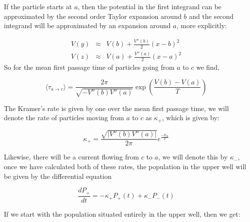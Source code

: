 If the particle starts at $a$, then the potential in the first integrand can be approximated by the second order Taylor expansion around $b$ and the second integrand will be approximated by an expansion around $a$, more explicitly:

\begin{eqnarray}
V(y) &\approx& V(b) + \frac{V''(b)}{2}(x - b)^2 \\
V(z) &\approx& V(a) + \frac{V''(a)}{2}(x - a)^2 
\end{eqnarray}
So for the mean first passage time of particles going from $a$ to $c$ we find,

\begin{equation}
\langle \tau_{a \to c} \rangle = \frac{2 \pi}{\sqrt{-V''(b) V''(a)}} \exp{\left (\frac{V(b) - V(a)}{T} \right)}  \label{eqn:kramersRate}
\end{equation}


The Kramer's rate is given by one over the mean first passage time, we will denote the rate of particles moving from $a$ to $c$ as $\kappa_+$, which is given by:

\begin{equation}
\kappa_+ = \frac{\sqrt{|V''(b) V''(a) |}}{2 \pi} e^\frac{-E_B}{T}
\end{equation}


Likewise, there will be a current flowing from $c$ to $a$, we will denote this by $\kappa_-$, once we have calculated both of these rates, the population in the upper well will be given by the differential equation

\begin{equation}
\frac{d P_+}{dt} = -\kappa_+ P_+(t) + \kappa_- P_-(t)
\end{equation}

If we start with the population situated entirely in the upper well, then we get:


